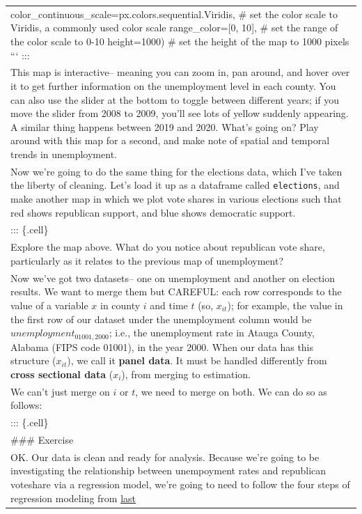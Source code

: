 \documentclass[
  letterpaper,
  DIV=11,
  numbers=noendperiod]{scrreprt}
\begin{document}
\begin{longtable}[]{@{}
  >{\raggedright\arraybackslash}p{}@{}}
color\_continuous\_scale=px.colors.sequential.Viridis, \# set the color
scale to Viridis, a commonly used color scale range\_color={[}0, 10{]},
\# set the range of the color scale to 0-10 height=1000) \# set the
height of the map to 1000 pixels ``` ::: \\
This map is interactive-- meaning you can zoom in, pan around, and hover
over it to get further information on the unemployment level in each
county. You can also use the slider at the bottom to toggle between
different years; if you move the slider from 2008 to 2009, you'll see
lots of yellow suddenly appearing. A similar thing happens between 2019
and 2020. What's going on? Play around with this map for a second, and
make note of spatial and temporal trends in unemployment. \\
Now we're going to do the same thing for the elections data, which I've
taken the liberty of cleaning. Let's load it up as a dataframe called
\texttt{elections}, and make another map in which we plot vote shares in
various elections such that red shows republican support, and blue shows
democratic support. \\
::: \{.cell\} \\
Explore the map above. What do you notice about republican vote share,
particularly as it relates to the previous map of unemployment? \\
Now we've got two datasets-- one on unemployment and another on election
results. We want to merge them but CAREFUL: each row corresponds to the
value of a variable \(x\) in county \(i\) and time \(t\) (so,
\(x_{it}\)); for example, the value in the first row of our dataset
under the unemployment column would be \(unemployment_{01001, 2000}\);
i.e., the unemployment rate in Atauga County, Alabama (FIPS code 01001),
in the year 2000. When our data has this structure (\(x_{it}\)), we call
it \textbf{panel data}. It must be handled differently from
\textbf{cross sectional data} (\(x_i\)), from merging to estimation. \\
We can't just merge on \(i\) or \(t\), we need to merge on both. We can
do so as follows: \\
::: \{.cell\} \\
\#\#\# Exercise \\
OK. Our data is clean and ready for analysis. Because we're going to be
investigating the relationship between unempoyment rates and republican
voteshare via a regression model, we're going to need to follow the four
steps of regression modeling from
\href{https://oballinger.github.io/QM2/notebooks/W09.\%20Linear\%20Regression.html}{last
}
\end{longtable}
\end{document}
